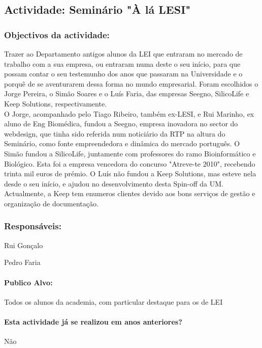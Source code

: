 \subsection{Actividade: Seminário "À lá LESI"} %

\subsubsection*{Objectivos da actividade:}
Trazer ao Departamento antigos alunos da LEI que entraram no mercado de trabalho com a sua empresa, ou entraram numa deste o seu início, para que possam contar o seu testemunho dos anos que passaram na Universidade e o porquê de se aventurarem dessa forma no mundo empresarial. Foram escolhidos o Jorge Pereira, o Simão Soares e o Luís Faria, das empresas Seegno, SilicoLife e Keep Solutions, respectivamente.\\
O Jorge, acompanhado pelo Tiago Ribeiro, também ex-LESI, e Rui Marinho, ex aluno de Eng Biomédica, fundou a Seegno, empresa inovadora no sector do webdesign, que tinha sido referida num noticiário da RTP na altura do Seminário, como fonte empreendedora e dinâmica do mercado português. O Simão fundou a SilicoLife, juntamente com professores do ramo Bioinformático e Biológico. Esta foi a empresa vencedora do concurso "Atreve-te 2010", recebendo trinta mil euros de prémio. O Luís não fundou a Keep Solutions, mas esteve nela desde o seu início, e ajudou no desenvolvimento desta Spin-off da UM. Actualmente, a Keep tem enumeros clientes devido aos bons serviços de gestão e organização de documentação.

\subsubsection*{Responsáveis:}
\begin{itemizedash}
	\item{Rui Gonçalo}
	\item{Pedro Faria}
\end{itemizedash}

\paragraph{Publico Alvo: }
Todos os alunos da academia, com particular destaque para os de LEI

\paragraph{Esta actividade já se realizou em anos anteriores?}
Não

